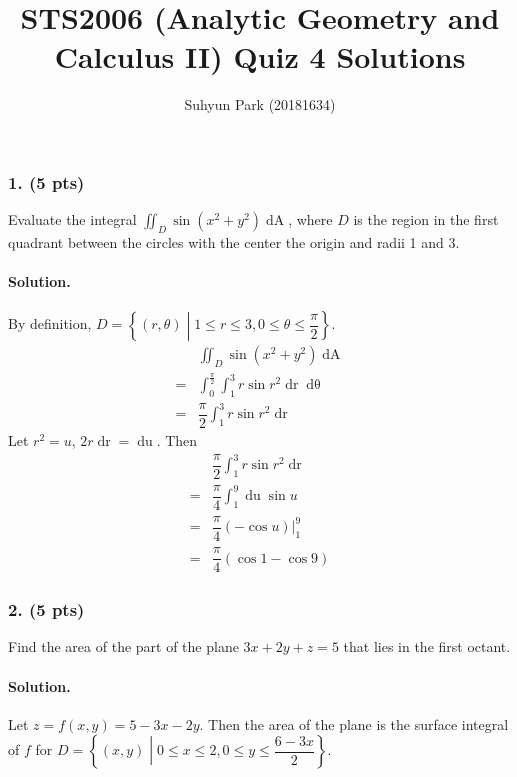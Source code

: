 
	


\title{STS2006 (Analytic Geometry and Calculus II) \newline Quiz 4 Solutions}
\author{Suhyun Park (20181634)}
\maketitle

\subsubsection{1. (5 pts)} Evaluate the integral $\iint_D \sin\left(x^2+y^2\right)\mathop{dA}$, where $D$ is the region in the first quadrant between the circles with the center the origin and radii 1 and 3.

\paragraph{Solution.} By definition, $D=\left\{\left(r, \theta\right)\middle| 1\leq r \leq3, 0\leq\theta\leq\dfrac{\pi}{2}\right\}$.
\begin{align*}
	& \iint_D \sin\left(x^2+y^2\right)\mathop{dA}\\
	=& \int^{\frac{\pi}{2}}_{0} \int^{3}_{1} r \sin r^2 \mathop{dr} \mathop{d\theta}\\
	=& \dfrac{\pi}{2} \int^{3}_{1} r \sin r^2 \mathop{dr}
\end{align*}
Let $r^2=u$, $2r\mathop{dr}=\mathop{du}$. Then
\begin{align*}
	& \dfrac{\pi}{2} \int^{3}_{1} r \sin r^2 \mathop{dr}\\
	=& \dfrac{\pi}{4} \int^{9}_{1}  \mathop{du} \sin u\\
	=& \dfrac{\pi}{4} \left.\left(-\cos u\right)\right|^9_1\\
	=& \dfrac{\pi}{4} \left(\cos 1 - \cos 9\right)
\end{align*}
\par

\subsubsection{2. (5 pts)} Find the area of the part of the plane $3x+2y+z=5$ that lies in the first octant.

\paragraph{Solution.} Let $z=f\left(x, y\right)=5-3x-2y$. Then the area of the plane is the surface integral of $f$ for $D=\left\{\left(x, y\right)\middle| 0\leq x \leq2, 0\leq y \leq\dfrac{6-3x}{2}\right\}$.

